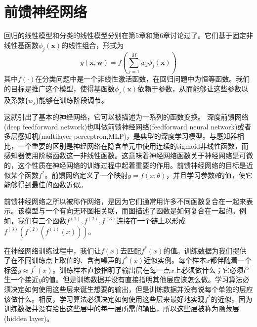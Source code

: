 \section{前馈神经网络}
回归的线性模型和分类的线性模型分别在第5章和第6章讨论过了。它们基于固定非线性基函数$\phi_j(\boldsymbol{x})$的线性组合，形式为
\begin{equation}	y(\boldsymbol{x},\boldsymbol{w})=f\left(\sum_{j=1}^{M}w_j\phi_j(\boldsymbol{x}) \right)
\end{equation}
其中$f(\cdot)$在分类问题中是一个非线性激活函数，在回归问题中为恒等函数。我们的目标是推广这个模型，使得基函数$\phi_j(\boldsymbol{x})$依赖于参数，从而能够让这些参数以及系数$\{w_j\}$能够在训练阶段调节。

这就引出了基本的神经网络，它可以被描述为一系列的函数变换。
深度前馈网络(deep feedforward network)也叫做前馈神经网络(feedforward neural network)或者多层感知机(multilayer perceptron,MLP)，是典型的深度学习模型。与感知器相比，一个重要的区别是神经网络在隐含单元中使用连续的sigmoid非线性函数，而感知器使用阶梯函数这一非线性函数。这意味着神经网络函数关于神经网络是可微的，这个性质在神经网络的训练过程中起着重要的作用。前馈神经网络的目标是近似某个函数$f^*$。前馈网络定义了一个映射$y=f(x;\theta)$，并且学习参数$\theta$的值，使它能够得到最佳的函数近似。

前馈神经网络之所以被称作网络，是因为它们通常用许多不同函数复合在一起来表示。该模型与一个有向无环图相关联，而图描述了函数是如何复合在一起的。例如，我们有三个函数$f^{(1)},f^{(2)},f^{(3)}$连接在一个链上以形成$f^{(3)}(f^{(2)}(f^{(1)}(x)))$。

在神经网络训练过程中，我们让$f(x)$去匹配$f^*(x)$的值。训练数据为我们提供了在不同训练点上取值的、含有噪声的$f^*(x)$近似实例。每个样本$x$都伴随着一个标签$y\approx f^*(x)$。训练样本直接指明了输出层在每一点$x$上必须做什么；它必须产生一个接近$y$的值。但是训练数据并没有直接指明其他层应该怎么做。学习算法必须决定如何使用这些层来诞生想要的输出，但是训练数据并没有说每个单独的层应该做什么。相反，学习算法必须决定如何使用这些层来最好地实现$f^*$的近似。因为训练数据并没有给出这些层中的每一层所需的输出，所以这些层被称为隐藏层(hidden layer)。


